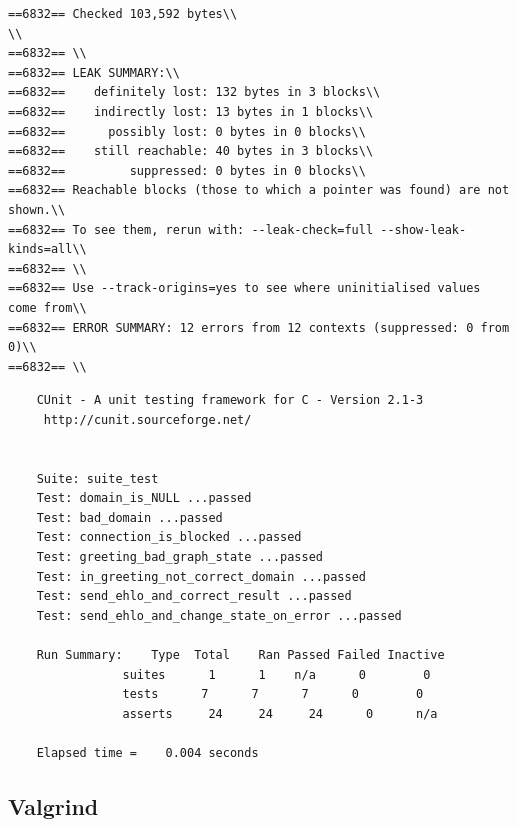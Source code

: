 \documentclass[a4paper,12pt]{report}
\begin{document}
\begin{verbatim}
==6832== Checked 103,592 bytes\\
\\
==6832== \\
==6832== LEAK SUMMARY:\\
==6832==    definitely lost: 132 bytes in 3 blocks\\
==6832==    indirectly lost: 13 bytes in 1 blocks\\
==6832==      possibly lost: 0 bytes in 0 blocks\\
==6832==    still reachable: 40 bytes in 3 blocks\\
==6832==         suppressed: 0 bytes in 0 blocks\\
==6832== Reachable blocks (those to which a pointer was found) are not shown.\\
==6832== To see them, rerun with: --leak-check=full --show-leak-kinds=all\\
==6832== \\
==6832== Use --track-origins=yes to see where uninitialised values come from\\
==6832== ERROR SUMMARY: 12 errors from 12 contexts (suppressed: 0 from 0)\\
==6832== \\
\end{verbatim}

\begin{verbatim}
    CUnit - A unit testing framework for C - Version 2.1-3
     http://cunit.sourceforge.net/


    Suite: suite_test
    Test: domain_is_NULL ...passed
    Test: bad_domain ...passed
    Test: connection_is_blocked ...passed
    Test: greeting_bad_graph_state ...passed
    Test: in_greeting_not_correct_domain ...passed
    Test: send_ehlo_and_correct_result ...passed
    Test: send_ehlo_and_change_state_on_error ...passed

    Run Summary:    Type  Total    Ran Passed Failed Inactive
                suites      1      1    n/a      0        0
                tests      7      7      7      0        0
                asserts     24     24     24      0      n/a

    Elapsed time =    0.004 seconds
\end{verbatim}

\subsection{Valgrind}
\end{document}
